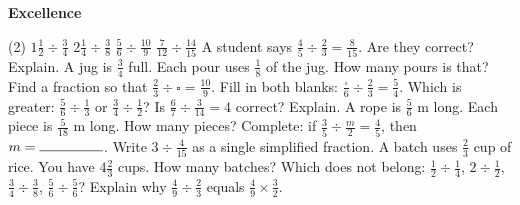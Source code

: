 \documentclass[17pt,a4paper,landscape]{extarticle}
\begin{document}
\sffamily
\boldmath

\boldmath

\vspace*{0.4em}
{\LARGE \textbf{Excellence}}
\begin{tasks}(2)
\task \mbox{$1\frac{1}{2}\div\frac{3}{4}$}
\task \mbox{$2\frac{1}{4}\div\frac{3}{8}$}
\task \mbox{$\frac{5}{6}\div\frac{10}{9}$}
\task \mbox{$\frac{7}{12}\div\frac{14}{15}$}
\task A student says \mbox{$\frac{4}{5}\div\frac{2}{3}=\frac{8}{15}$}. Are they correct? Explain.
\task A jug is \mbox{$\frac{3}{4}$} full. Each pour uses \mbox{$\frac{1}{8}$} of the jug. How many pours is that?
\task Find a fraction so that \mbox{$\frac{2}{3}\div\square=\frac{10}{9}$}.
\task Fill in both blanks: \mbox{$\frac{\square}{6}\div\frac{2}{3}=\frac{5}{4}$}.
\task Which is greater: \mbox{$\frac{5}{6}\div\frac{1}{3}$} or \mbox{$\frac{3}{4}\div\frac{1}{2}$}?
\task Is \mbox{$\frac{6}{7}\div\frac{3}{14}=4$} correct? Explain.
\task A rope is \mbox{$\frac{5}{6}$} m long. Each piece is \mbox{$\frac{5}{18}$} m long. How many pieces?
\task Complete: if \mbox{$\frac{3}{5}\div\frac{m}{2}=\frac{4}{5}$}, then \mbox{$m=\rule{1.6cm}{0.15mm}$}.
\task Write \mbox{$3\div\frac{4}{15}$} as a single simplified fraction.
\task A batch uses \mbox{$\frac{2}{3}$} cup of rice. You have \mbox{$4\frac{2}{3}$} cups. How many batches?
\task Which does not belong: \mbox{$\frac{1}{2}\div\frac{1}{4}$}, \mbox{$2\div\frac{1}{2}$}, \mbox{$\frac{3}{4}\div\frac{3}{8}$}, \mbox{$\frac{5}{6}\div\frac{5}{6}$}?
\task Explain why \mbox{$\frac{4}{9}\div\frac{2}{3}$} equals \mbox{$\frac{4}{9}\times\frac{3}{2}$}.
\end{tasks}
\end{document}
